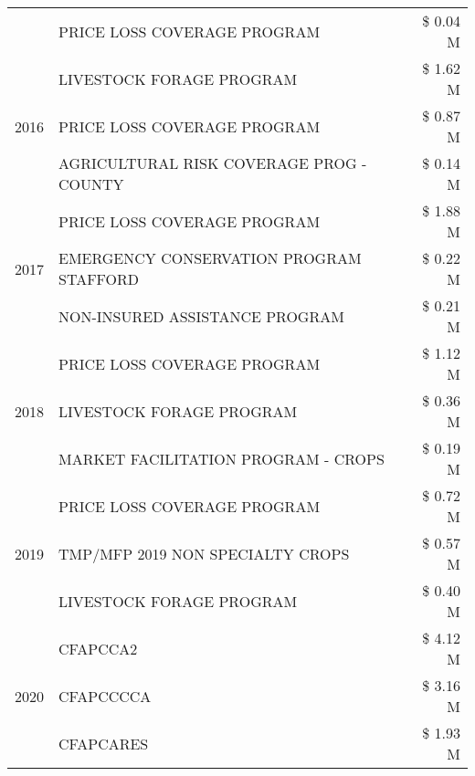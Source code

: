 \begin{tabular}{llr}
 & PRICE LOSS COVERAGE PROGRAM & \$ 0.04 M \\
\cline{1-3}
\multirow[t]{3}{*}{2016} & LIVESTOCK FORAGE PROGRAM & \$ 1.62 M \\
 & PRICE LOSS COVERAGE PROGRAM & \$ 0.87 M \\
 & AGRICULTURAL RISK COVERAGE PROG - COUNTY & \$ 0.14 M \\
\cline{1-3}
\multirow[t]{3}{*}{2017} & PRICE LOSS COVERAGE PROGRAM & \$ 1.88 M \\
 & EMERGENCY CONSERVATION PROGRAM STAFFORD & \$ 0.22 M \\
 & NON-INSURED ASSISTANCE PROGRAM & \$ 0.21 M \\
\cline{1-3}
\multirow[t]{3}{*}{2018} & PRICE LOSS COVERAGE PROGRAM & \$ 1.12 M \\
 & LIVESTOCK FORAGE PROGRAM & \$ 0.36 M \\
 & MARKET FACILITATION PROGRAM - CROPS & \$ 0.19 M \\
\cline{1-3}
\multirow[t]{3}{*}{2019} & PRICE LOSS COVERAGE PROGRAM & \$ 0.72 M \\
 & TMP/MFP 2019 NON SPECIALTY CROPS & \$ 0.57 M \\
 & LIVESTOCK FORAGE PROGRAM & \$ 0.40 M \\
\cline{1-3}
\multirow[t]{3}{*}{2020} & CFAPCCA2 & \$ 4.12 M \\
 & CFAPCCCCA & \$ 3.16 M \\
 & CFAPCARES & \$ 1.93 M \\
\cline{1-3}
\bottomrule
\end{tabular}
